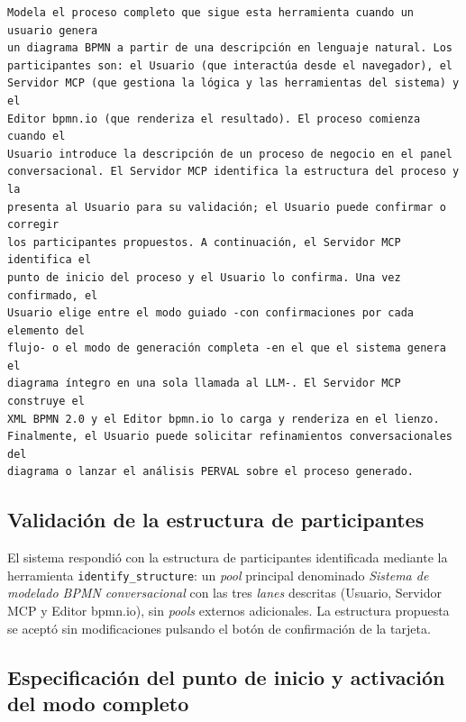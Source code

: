 \begin{lstlisting}[style=promptbox]
Modela el proceso completo que sigue esta herramienta cuando un usuario genera
un diagrama BPMN a partir de una descripción en lenguaje natural. Los
participantes son: el Usuario (que interactúa desde el navegador), el
Servidor MCP (que gestiona la lógica y las herramientas del sistema) y el
Editor bpmn.io (que renderiza el resultado). El proceso comienza cuando el
Usuario introduce la descripción de un proceso de negocio en el panel
conversacional. El Servidor MCP identifica la estructura del proceso y la
presenta al Usuario para su validación; el Usuario puede confirmar o corregir
los participantes propuestos. A continuación, el Servidor MCP identifica el
punto de inicio del proceso y el Usuario lo confirma. Una vez confirmado, el
Usuario elige entre el modo guiado -con confirmaciones por cada elemento del
flujo- o el modo de generación completa -en el que el sistema genera el
diagrama íntegro en una sola llamada al LLM-. El Servidor MCP construye el
XML BPMN 2.0 y el Editor bpmn.io lo carga y renderiza en el lienzo.
Finalmente, el Usuario puede solicitar refinamientos conversacionales del
diagrama o lanzar el análisis PERVAL sobre el proceso generado.
\end{lstlisting}

\subsection{Validación de la estructura de participantes}
\label{subsec:anx1-estructura}

El sistema respondió con la estructura de participantes identificada mediante la herramienta \texttt{identify\_structure}: un \textit{pool} principal denominado \textit{Sistema de modelado BPMN conversacional} con las tres \textit{lanes} descritas (Usuario, Servidor MCP y Editor bpmn.io), sin \textit{pools} externos adicionales. La estructura propuesta se aceptó sin modificaciones pulsando el botón de confirmación de la tarjeta.

\subsection{Especificación del punto de inicio y activación del modo completo}
\label{subsec:anx1-inicio}

